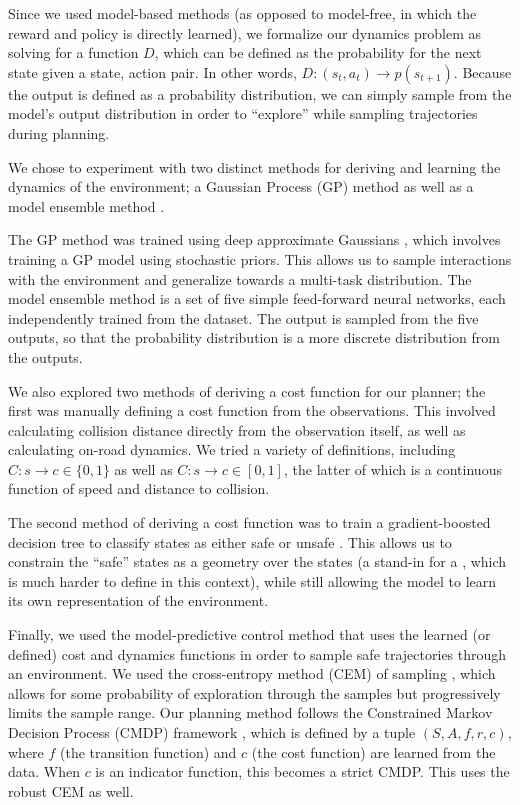 \documentclass{article}
\begin{document}
Since we used model-based methods (as opposed to model-free, in which the reward and policy is directly learned), we formalize our dynamics problem as solving for a function $D$, which can be defined as the probability for the next state given a state, action pair. In other words, $D: (s_t, a_t) \rightarrow p(s_{t + 1})$. Because the output is defined as a probability distribution, we can simply sample from the model's output distribution in order to ``explore'' while sampling trajectories during planning.

We chose to experiment with two distinct methods for deriving and learning the dynamics of the environment; a Gaussian Process (GP) method \citep{liu2022simple} as well as a model ensemble method \citep{wu2021uncertaintyaware}.

The GP method was trained using deep approximate Gaussians \citep{salimbeni2017doubly}, which involves training a GP model using stochastic priors. This allows us to sample interactions with the environment and generalize towards a multi-task distribution. The model ensemble method is a set of five simple feed-forward neural networks, each independently trained from the dataset. The output is sampled from the five outputs, so that the probability distribution is a more discrete distribution from the outputs.

We also explored two methods of deriving a cost function for our planner; the first was manually defining a cost function from the observations. This involved calculating collision distance directly from the observation itself, as well as calculating on-road dynamics. We tried a variety of definitions, including $C: s \rightarrow c \in \{0, 1\}$ as well as $C: s \rightarrow c \in [0, 1]$, the latter of which is a continuous function of speed and distance to collision.

The second method of deriving a cost function was to train a gradient-boosted decision tree to classify states as either safe or unsafe \citep{liu2021constrained}. This allows us to constrain the ``safe'' states as a geometry over the states (a stand-in for a \citep{NEURIPS2018_34ffeb35}, which is much harder to define in this context), while still allowing the model to learn its own representation of the environment.

Finally, we used the model-predictive control method that uses the learned (or defined) cost and dynamics functions in order to sample safe trajectories through an environment. We used the cross-entropy method (CEM) of sampling \citep{dalal2018safe}, which allows for some probability of exploration through the samples but progressively limits the sample range. Our planning method follows the Constrained Markov Decision Process (CMDP) framework \citep{liu2021constrained}, which is defined by a tuple $(S, A, f, r, c)$, where $f$ (the transition function) and $c$ (the cost function) are learned from the data. When $c$ is an indicator function, this becomes a strict CMDP. This uses the robust CEM as well.
\end{document}
